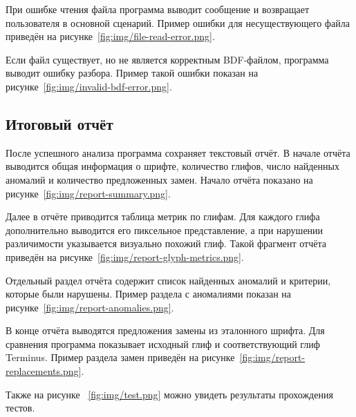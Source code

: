 
При ошибке чтения файла программа выводит сообщение и возвращает пользователя в основной сценарий. Пример ошибки для несуществующего файла приведён на рисунке~\ref{fig:img/file-read-error.png}.


Если файл существует, но не является корректным BDF-файлом, программа выводит ошибку разбора. Пример такой ошибки показан на рисунке~\ref{fig:img/invalid-bdf-error.png}.


\subsection{Итоговый отчёт}

После успешного анализа программа сохраняет текстовый отчёт. В начале отчёта выводится общая информация о шрифте, количество глифов, число найденных аномалий и количество предложенных замен. Начало отчёта показано на рисунке~\ref{fig:img/report-summary.png}.


Далее в отчёте приводится таблица метрик по глифам. Для каждого глифа дополнительно выводится его пиксельное представление, а при нарушении различимости указывается визуально похожий глиф. Такой фрагмент отчёта приведён на рисунке~\ref{fig:img/report-glyph-metrics.png}.


Отдельный раздел отчёта содержит список найденных аномалий и критерии, которые были нарушены. Пример раздела с аномалиями показан на рисунке~\ref{fig:img/report-anomalies.png}.


В конце отчёта выводятся предложения замены из эталонного шрифта. Для сравнения программа показывает исходный глиф и соответствующий глиф Terminus. Пример раздела замен приведён на рисунке~\ref{fig:img/report-replacements.png}.


Также на рисунке ~\ref{fig:img/test.png} можно увидеть результаты прохождения тестов.


\newpage
